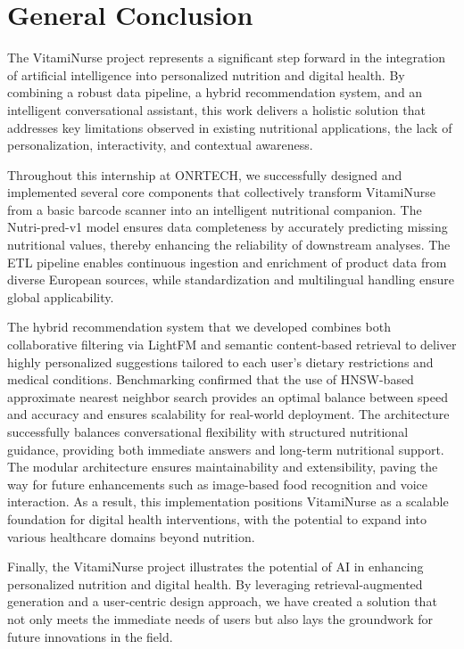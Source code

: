 \chapter*{General Conclusion}
The VitamiNurse project represents a significant step forward in the integration of artificial intelligence into personalized nutrition and digital health. 
By combining a robust data pipeline, a hybrid recommendation system, and an intelligent conversational assistant, this work delivers a holistic solution that addresses key limitations observed 
in existing nutritional applications, the lack of personalization, interactivity, and contextual awareness. 

Throughout this internship at ONRTECH, we successfully designed and implemented several core components that collectively transform VitamiNurse from a basic 
barcode scanner into an intelligent nutritional companion. The Nutri-pred-v1 model ensures data completeness by accurately predicting missing nutritional values, 
thereby enhancing the reliability of downstream analyses. The ETL pipeline enables continuous ingestion and enrichment of product data from diverse European sources, 
while standardization and multilingual handling ensure global applicability. 

The hybrid recommendation system that we developed combines both collaborative filtering via LightFM and semantic content-based retrieval to deliver highly personalized suggestions tailored to each user’s dietary restrictions and medical conditions. 
Benchmarking confirmed that the use of HNSW-based approximate nearest neighbor search provides an optimal balance between speed and accuracy and  ensures scalability for real-world deployment. 
The architecture successfully balances conversational flexibility with structured nutritional guidance, providing both immediate answers and long-term nutritional support. 
The modular architecture ensures maintainability and extensibility, paving the way for future enhancements such as image-based food recognition and voice interaction. As a result, this implementation positions VitamiNurse as a scalable foundation for digital health interventions, with the potential to expand into various healthcare domains beyond nutrition. 

Finally, the VitamiNurse project illustrates the potential of AI in enhancing personalized nutrition and digital health. By leveraging retrieval-augmented generation and a user-centric design approach, we have created a solution that not only meets the immediate needs of users but also lays the groundwork for future innovations in the field.